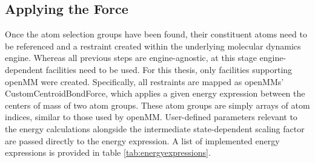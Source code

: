 \documentclass[oneside]{scrreprt}
\begin{document}
\subsection{Applying the Force}


Once the atom selection groups have been found, their constituent atoms need to be referenced and a restraint created within the underlying molecular dynamics engine. Whereas all previous steps are engine-agnostic, at this stage engine-dependent facilities need to be used. For this thesis, only facilities supporting openMM were created. Specifically, all restraints are mapped as openMMs' CustomCentroidBondForce, which applies a given energy expression between the centers of mass of two atom groups. These atom groups are simply arrays of atom indices, similar to those used by openMM. User-defined parameters relevant to the energy calculations alongside the intermediate state-dependent scaling factor are passed directly to the energy expression. A list of implemented energy expressions is provided in table \ref{tab:energyexpressions}.

\begin{table}[h]
\caption[Overview of the available energy expressions and their corresponding potential shapes.]{Overview of the available energy expressions and their corresponding potential shapes. $k$ refers to the spring constant, $r$ is the current and $r_0$ the initial distance between atom groups \texttt{group1} ($g1$) and \texttt{group2} ($g2$)}
\label{tab:energyexpressions}
\end{table}
\end{document}
